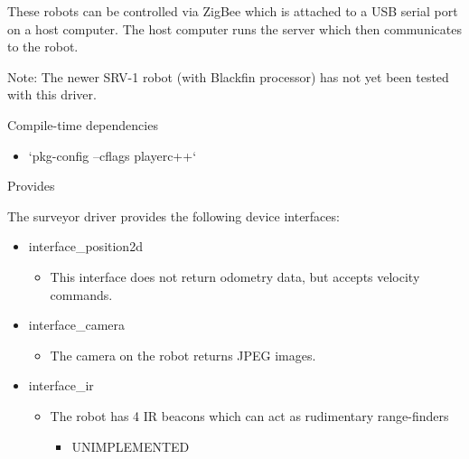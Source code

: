 These robots can be controlled via ZigBee which is attached to a USB serial port on a host computer. The host computer runs the server which then communicates to the robot.

\begin{Desc}
\item[Note:]The newer SRV-1 robot (with Blackfin processor) has not yet been tested with this driver.\end{Desc}
\begin{Desc}
\item[Compile-time dependencies]\end{Desc}
\begin{itemize}
\item `pkg-config --cflags playerc++`\end{itemize}


\begin{Desc}
\item[Provides]\end{Desc}
The surveyor driver provides the following device interfaces:

\begin{itemize}
\item interface\_\-position2d\begin{itemize}
\item This interface does not return odometry data, but accepts velocity commands.\end{itemize}
\end{itemize}


\begin{itemize}
\item interface\_\-camera\begin{itemize}
\item The camera on the robot returns JPEG images.\end{itemize}
\end{itemize}


\begin{itemize}
\item interface\_\-ir\begin{itemize}
\item The robot has 4 IR beacons which can act as rudimentary range-finders\begin{itemize}
\item UNIMPLEMENTED\end{itemize}
\end{itemize}
\end{itemize}


